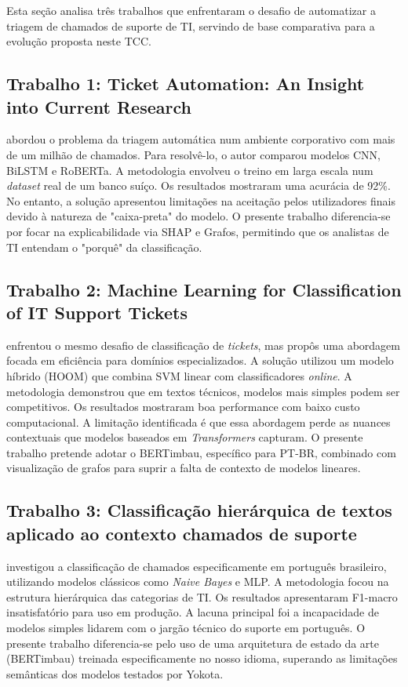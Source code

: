 \documentclass[
    12pt,                %
    openright,           %
    oneside,             %
    a4paper,             %
    english,             %
    brazil               %
]{abntex2}
\begin{document}
Esta seção analisa três trabalhos que enfrentaram o desafio de automatizar a triagem de chamados de suporte de TI, servindo de base comparativa para a evolução proposta neste TCC.

\subsection{Trabalho 1: Ticket Automation: An Insight into Current Research}

 abordou o problema da triagem automática num ambiente corporativo com mais de um milhão de chamados. Para resolvê-lo, o autor comparou modelos CNN, BiLSTM e RoBERTa. A metodologia envolveu o treino em larga escala num \textit{dataset} real de um banco suíço. Os resultados mostraram uma acurácia de 92\%. No entanto, a solução apresentou limitações na aceitação pelos utilizadores finais devido à natureza de "caixa-preta" do modelo. O presente trabalho diferencia-se por focar na explicabilidade via SHAP e Grafos, permitindo que os analistas de TI entendam o "porquê" da classificação.

\subsection{Trabalho 2: Machine Learning for Classification of IT Support Tickets}

 enfrentou o mesmo desafio de classificação de \textit{tickets}, mas propôs uma abordagem focada em eficiência para domínios especializados. A solução utilizou um modelo híbrido (HOOM) que combina SVM linear com classificadores \textit{online}. A metodologia demonstrou que em textos técnicos, modelos mais simples podem ser competitivos. Os resultados mostraram boa performance com baixo custo computacional. A limitação identificada é que essa abordagem perde as nuances contextuais que modelos baseados em \textit{Transformers} capturam. O presente trabalho pretende adotar o BERTimbau, específico para PT-BR, combinado com visualização de grafos para suprir a falta de contexto de modelos lineares.

\subsection{Trabalho 3: Classificação hierárquica de textos aplicado ao contexto chamados de suporte}

 investigou a classificação de chamados especificamente em português brasileiro, utilizando modelos clássicos como \textit{Naive Bayes} e MLP. A metodologia focou na estrutura hierárquica das categorias de TI. Os resultados apresentaram F1-macro insatisfatório para uso em produção. A lacuna principal foi a incapacidade de modelos simples lidarem com o jargão técnico do suporte em português. O presente trabalho diferencia-se pelo uso de uma arquitetura de estado da arte (BERTimbau) treinada especificamente no nosso idioma, superando as limitações semânticas dos modelos testados por Yokota.
\end{document}
